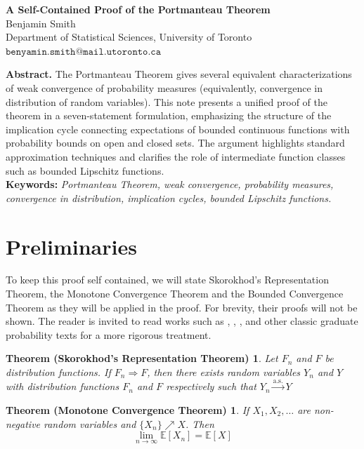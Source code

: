 \documentclass[11pt]{article}
\newtheorem*{mct}{Theorem (Monotone Convergence Theorem)}
\newtheorem*{skorohod}{Theorem (Skorokhod's Representation Theorem)}
\begin{document}
\begin{center}
{\Large \textbf{A Self-Contained Proof of the Portmanteau Theorem}}\\[0.5em]
{\normalsize Benjamin Smith}\\
{\normalsize Department of Statistical Sciences, University of Toronto}\\
{\normalsize $\texttt{benyamin.smith@mail.utoronto.ca}$}
\end{center}

\vspace{1em}

\noindent\textbf{Abstract.}
The Portmanteau Theorem gives several equivalent characterizations of weak convergence of probability measures (equivalently, convergence in distribution of random variables). This note presents a unified proof of the theorem in a seven-statement formulation, emphasizing the structure of the implication cycle connecting expectations of bounded continuous functions with probability bounds on open and closed sets. The argument highlights standard approximation techniques and clarifies the role of intermediate function classes such as bounded Lipschitz functions.
\\
\noindent \textbf{Keywords:} \textit{Portmanteau Theorem, weak convergence, probability measures, convergence in distribution, implication cycles, bounded Lipschitz functions.}

\section{Preliminaries}
 To keep this proof self contained, we will state Skorokhod's Representation Theorem, the Monotone Convergence Theorem and the Bounded Convergence Theorem as they will be applied in the proof. For brevity, their proofs will not be shown. The reader is invited to read works such as \cite{Billingsley1999}, \cite{Pollard_2001}, \cite{Rosenthal2006}, \cite{durrett:2019} and other classic graduate probability texts for a more rigorous treatment.

\begin{skorohod}
Let $F_n$ and $F$ be distribution functions.  If $F_n \Rightarrow F$, then there exists random variables $Y_n$ and $Y$ with distribution functions $F_n$ and $F$ respectively such that $Y_n \overset{\text{a.s.}}{\longrightarrow}Y$
\end{skorohod}

\begin{mct}
If $X_1, X_2, \dots$ are non-negative random variables and  $\{X_n\}\nearrow X$. Then
$$
\lim_{n \rightarrow\infty}\mathbb{E}[X_n] = \mathbb{E}[X]
$$
\end{mct}
\end{document}
